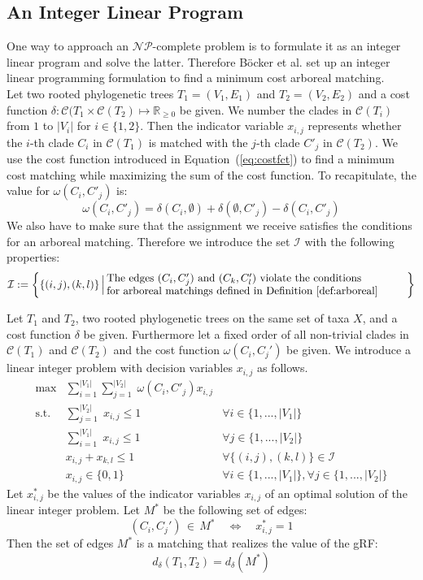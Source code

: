 \subsection{An Integer Linear Program}
One way to approach an $\mathcal{NP}$-complete problem is to formulate it as an integer linear program and solve the latter. Therefore Böcker et al. set up an integer linear programming formulation to find a minimum cost arboreal matching.\\
Let two rooted phylogenetic trees $T_1 = (V_1,E_1)$ and $T_2 = (V_2,E_2)$ and a cost function $\delta: \mathcal{C}(T_1 \times \mathcal{C}(T_2) \mapsto \mathbb{R}_{\geq 0}$ be given. We number the clades in $\mathcal{C}(T_i)$ from $1$ to $|V_i|$ for $i \in \{1,2\}$. Then the indicator variable $x_{i,j}$ represents whether the $i$-th clade $C_i$ in $\mathcal{C}(T_1)$ is matched with the $j$-th clade $C'_j$ in $\mathcal{C}(T_2)$. We use the cost function introduced in Equation~(\ref{eq:costfct}) to find a minimum cost matching while maximizing the sum of the cost function. To recapitulate, the value for $\omega(C_i,C'_j)$ is:
$$\omega(C_i,C'_j) = \delta(C_i,\emptyset) + \delta(\emptyset, C'_j) - \delta(C_i,C'_j)$$
We also have to make sure that the assignment we receive satisfies the conditions for an arboreal matching. Therefore we introduce the set $\mathcal{I}$ with the following properties:
\begin{equation*}
\mathcal{I} := \bigg\{ \{(i,j), (k,l)\} \, \Big| \, \parbox{9.8cm}{The edges $(C_i, C'_j)$ and $(C_k, C'_l)$ violate the conditions
\\for arboreal matchings defined in Definition~\ref{def:arboreal}} \bigg\}
\end{equation*}
\begin{thm}\label{thm:gRF_LP}
Let $T_1$ and $T_2$, two rooted phylogenetic trees on the same set of taxa $X$, and a cost function $\delta$ be given. Furthermore let a fixed order of all non-trivial clades in $\mathcal{C}(T_1)$ and $\mathcal{C}(T_2)$ and the cost function $\omega(C_i,C_j')$ be given. We introduce a linear integer problem with decision variables $x_{i,j}$ as follows.
\begin{align}
\max &\sum_{i=1}^{|V_1|} \sum_{j=1}^{|V_2|} \; \omega(C_i, C'_j) x_{i,j} \label{eq:max} \\
\text{s.t.} &\sum_{j=1}^{|V_2|} \; x_{i,j} \leq 1 & \forall i \in \{1,...,|V_1|\} \label{eq:V_1} \\
&\sum_{i=1}^{|V_1|} \; x_{i,j} \leq 1 & \forall j \in \{1,...,|V_2|\} \label{eq:V_2} \\
&x_{i,j} + x_{k,l} \leq 1 & \forall \{(i,j), (k,l)\} \in \mathcal{I} \label{eq:arb} \\
&x_{i,j} \in \{0,1\} & \forall i \in \{1,...,|V_1|\}, \forall j \in \{1,...,|V_2|\} \label{eq:int}
\end{align}
Let $x^*_{i,j}$ be the values of the indicator variables $x_{i,j}$ of an optimal solution of the linear integer problem. Let $M^*$ be the following set of edges:
$$(C_i,C_j') \, \in \, M^* \quad \Leftrightarrow \quad x^*_{i,j} = 1$$
Then the set of edges $M^*$ is a matching that realizes the value of the gRF:
$$d_{\delta}(T_1, T_2) = d_{\delta}(M^*)$$
\end{thm}
